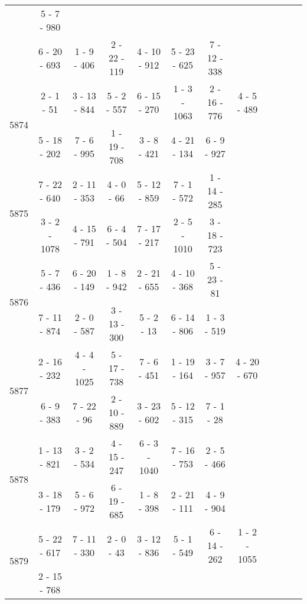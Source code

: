 \begin{longtable}{c | c | c | c | c | c | c | c | c | c | c | c}
&
5 - 7 - 980
&\space\\* \space
&
6 - 20 - 693
&
1 - 9 - 406
&
2 - 22 - 119
&
4 - 10 - 912
&
5 - 23 - 625
&
7 - 12 - 338
&\space\\\hline
\multirow{2}{*}{5874}
& 2 - 1 - 51
&
3 - 13 - 844
&
5 - 2 - 557
&
6 - 15 - 270
&
1 - 3 - 1063
&
2 - 16 - 776
&
4 - 5 - 489
\\* \space
&
5 - 18 - 202
&
7 - 6 - 995
&
1 - 19 - 708
&
3 - 8 - 421
&
4 - 21 - 134
&
6 - 9 - 927
&\space\\\hline
\multirow{2}{*}{5875}
& 7 - 22 - 640
&
2 - 11 - 353
&
4 - 0 - 66
&
5 - 12 - 859
&
7 - 1 - 572
&
1 - 14 - 285
&\space\\* \space
&
3 - 2 - 1078
&
4 - 15 - 791
&
6 - 4 - 504
&
7 - 17 - 217
&
2 - 5 - 1010
&
3 - 18 - 723
&\space\\\hline
\multirow{2}{*}{5876}
& 5 - 7 - 436
&
6 - 20 - 149
&
1 - 8 - 942
&
2 - 21 - 655
&
4 - 10 - 368
&
5 - 23 - 81
&\space\\* \space
&
7 - 11 - 874
&
2 - 0 - 587
&
3 - 13 - 300
&
5 - 2 - 13
&
6 - 14 - 806
&
1 - 3 - 519
&\space\\\hline
\multirow{2}{*}{5877}
& 2 - 16 - 232
&
4 - 4 - 1025
&
5 - 17 - 738
&
7 - 6 - 451
&
1 - 19 - 164
&
3 - 7 - 957
&
4 - 20 - 670
\\* \space
&
6 - 9 - 383
&
7 - 22 - 96
&
2 - 10 - 889
&
3 - 23 - 602
&
5 - 12 - 315
&
7 - 1 - 28
&\space\\\hline
\multirow{2}{*}{5878}
& 1 - 13 - 821
&
3 - 2 - 534
&
4 - 15 - 247
&
6 - 3 - 1040
&
7 - 16 - 753
&
2 - 5 - 466
&\space\\* \space
&
3 - 18 - 179
&
5 - 6 - 972
&
6 - 19 - 685
&
1 - 8 - 398
&
2 - 21 - 111
&
4 - 9 - 904
&\space\\\hline
\multirow{2}{*}{5879}
& 5 - 22 - 617
&
7 - 11 - 330
&
2 - 0 - 43
&
3 - 12 - 836
&
5 - 1 - 549
&
6 - 14 - 262
&
1 - 2 - 1055
\\* \space
&
2 - 15 - 768
&

\end{longtable}
